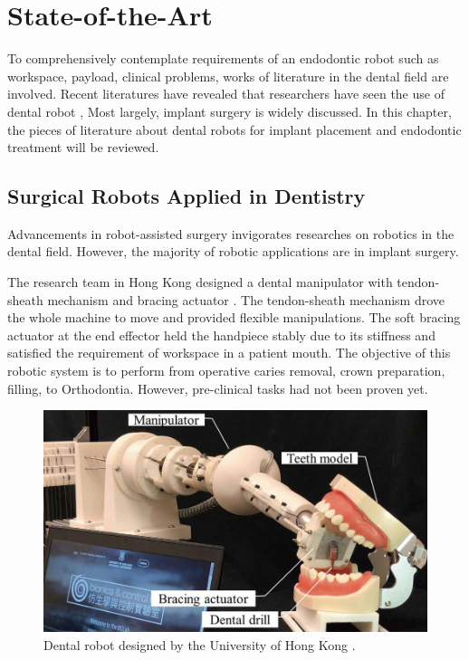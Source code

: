 \chapter{State-of-the-Art}
\label{chapter2}
\hspace*{6mm}To comprehensively contemplate requirements of an endodontic robot such as workspace, payload, clinical problems, works of literature in the dental field are involved. Recent literatures have revealed that researchers have seen the use of dental robot \cite{rawtiya2014application}\cite{s21103308}\cite{bhat2017robotics}, Most largely, implant surgery is widely discussed\cite{haidar2017autonomous}\cite{wu2019robotics}. In this chapter, the pieces of literature about dental robots for implant placement and endodontic treatment will be reviewed.
\section{Surgical Robots Applied in Dentistry}
\hspace*{6mm}Advancements in robot-assisted surgery invigorates researches on robotics in the dental field. However, the majority of robotic applications are in implant surgery. 
\par
The research team in Hong Kong designed a dental manipulator with tendon-sheath mechanism and bracing actuator \cite{Li2019ACD}. The tendon-sheath mechanism drove the whole machine to move and provided flexible manipulations. The soft bracing actuator at the end effector held the handpiece stably due to its stiffness and satisfied the requirement of workspace in a patient mouth. The objective of this robotic system is to perform from operative caries removal, crown preparation, filling, to Orthodontia. However, pre-clinical tasks had not been proven yet.
\begin{figure}[htbp]
\begin{center}
\includegraphics[width=0.9\linewidth]{Images/hongkong_1.png}
\caption[Dental robot designed by the University of Hong Kong]{
Dental robot designed by the University of Hong Kong \cite{Li2019ACD}.
}\label{fig:hongkong}
\end{center}
\end{figure}
